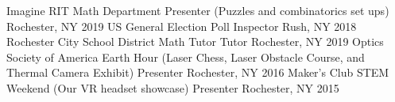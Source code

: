 \begin{cvhonors}
 \cvhonor
    {Imagine RIT Math Department}
    {Presenter (Puzzles and combinatorics set ups)}
    {Rochester, NY}
    {2019}
  \cvhonor
    {US General Election}
    {Poll Inspector}
    {Rush, NY}
    {2018}
 \cvhonor
    {Rochester City School District Math Tutor}
    {Tutor}
    {Rochester, NY}
    {2019}
  \cvhonor
    {Optics Society of America Earth Hour}
    {(Laser Chess, Laser Obstacle Course, and Thermal Camera Exhibit) Presenter}
    {Rochester, NY}
    {2016}
  \cvhonor
    {Maker's Club STEM Weekend (Our VR headset showcase)}
    {Presenter}
    {Rochester, NY}
    {2015}
\end{cvhonors}
